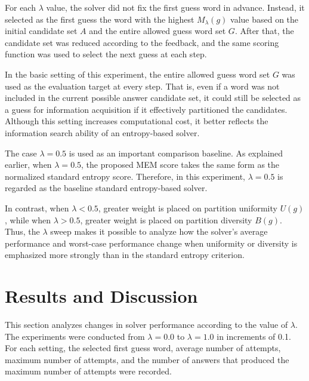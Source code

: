 \documentclass[11pt]{article}
\begin{document}
For each $\lambda$ value, the solver did not fix the first guess word in advance.
Instead, it selected as the first guess the word with the highest $M_{\lambda}(g)$ value based on the initial candidate set $A$ and the entire allowed guess word set $G$.
After that, the candidate set was reduced according to the feedback, and the same scoring function was used to select the next guess at each step.

In the basic setting of this experiment, the entire allowed guess word set $G$ was used as the evaluation target at every step.
That is, even if a word was not included in the current possible answer candidate set, it could still be selected as a guess for information acquisition if it effectively partitioned the candidates.
Although this setting increases computational cost, it better reflects the information search ability of an entropy-based solver.

The case $\lambda = 0.5$ is used as an important comparison baseline.
As explained earlier, when $\lambda = 0.5$, the proposed MEM score takes the same form as the normalized standard entropy score.
Therefore, in this experiment, $\lambda = 0.5$ is regarded as the baseline standard entropy-based solver.

In contrast, when $\lambda < 0.5$, greater weight is placed on partition uniformity $U(g)$, while when $\lambda > 0.5$, greater weight is placed on partition diversity $B(g)$.
Thus, the $\lambda$ sweep makes it possible to analyze how the solver's average performance and worst-case performance change when uniformity or diversity is emphasized more strongly than in the standard entropy criterion.
















\section{Results and Discussion}
\label{sec:results}

This section analyzes changes in solver performance according to the value of $\lambda$.
The experiments were conducted from $\lambda = 0.0$ to $\lambda = 1.0$ in increments of 0.1.
For each setting, the selected first guess word, average number of attempts, maximum number of attempts, and the number of answers that produced the maximum number of attempts were recorded.
\end{document}
